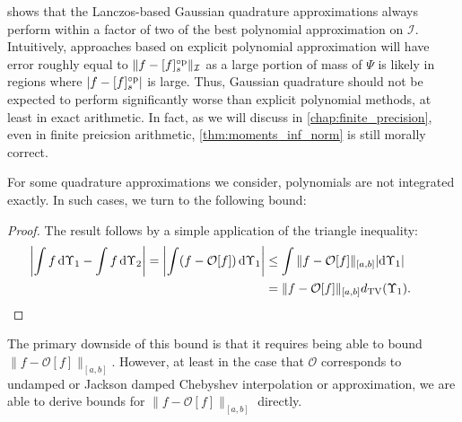  shows that the Lanczos-based Gaussian quadrature approximations always perform within a factor of two of the best polynomial approximation on \( \mathcal{I} \).
Intuitively, approaches based on explicit polynomial approximation will have error roughly equal to \( \|f-\ff{f}{s}\|_{\mathcal{I}} \) as a large portion of mass of \( \Psi \) is likely in regions where \( | f-\ff{f}{s} | \) is large.
Thus, Gaussian quadrature should not be expected to perform significantly worse than explicit polynomial methods, at least in exact arithmetic.
In fact, as we will discuss in \cref{chap:finite_precision}, even in finite preicsion arithmetic, \cref{thm:moments_inf_norm} is still morally correct.


For some quadrature approximations we consider, polynomials are not integrated exactly.
In such cases, we turn to the following bound:

\begin{proof}%
The result follows by a simple application of the triangle inequality:
\begin{align*}
    \left| \int f \,\textup{d}\Upsilon_1
    - \int f \,\textup{d}\Upsilon_2 \right|
    = \left| \int ( f - \mathcal{O}[f]) \,\textup{d}\Upsilon_1 \right|
    &\leq \int \| f - \mathcal{O}[f] \|_{[a,b]} |\textup{d}\Upsilon_1|
    \\&= \| f - \mathcal{O}[f] \|_{[a,b]} d_{\mathrm{TV}}(\Upsilon_1).
    \tag*{\qedhere}
\end{align*}
\end{proof}

The primary downside of this bound is that it requires being able to bound \( \| f - \mathcal{O}[f] \|_{[a,b]} \).
However, at least in the case that \( \mathcal{O} \) corresponds to undamped or Jackson damped Chebyshev interpolation or approximation, we are able to derive bounds for \( \| f - \mathcal{O}[f] \|_{[a,b]} \) directly.



